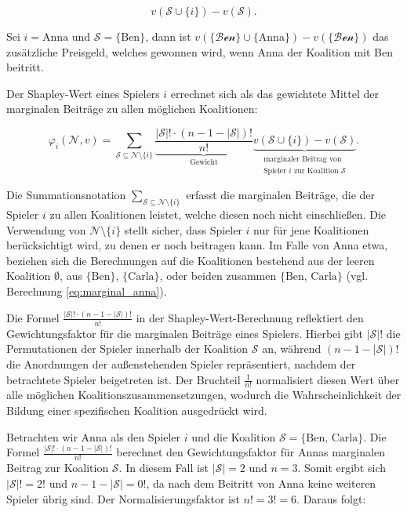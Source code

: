 \begin{equation}
v(\mathcal{S} \cup \{i\}) - v(\mathcal{S}).
\label{eq:marignal}
\end{equation}


Sei $i = \text{Anna}$ und $\mathcal{S} = \{\text{Ben}\}$, dann ist $v(\mathcal{\{\text{Ben}\}} \cup \{\text{Anna}\}) - v(\mathcal{\{\text{Ben}\}})$ das
zusätzliche Preisgeld, welches gewonnen wird, wenn Anna der Koalition mit Ben beitritt. 


Der Shapley-Wert eines Spielers $i$ errechnet sich als das gewichtete Mittel der marginalen Beiträge zu allen möglichen Koalitionen:

\begin{equation}
\varphi_i (\mathcal{N}, v) = \sum_{\mathcal{S} \subseteq \mathcal{N} \setminus \{i\}} \underbrace{\frac{|\mathcal{S}|! \cdot (n - 1 - |\mathcal{S}|)!}{n!}}_{\text{Gewicht}} \underbrace{v(\mathcal{S} \cup \{i\}) - v(\mathcal{S})}_{\substack{\text{marginaler Beitrag von} \\ \text{Spieler $i$ zur Koalition $\mathcal{S}$}}}.
\end{equation}

Die Summationsnotation \(\sum_{\mathcal{S} \subseteq \mathcal{N} \setminus \{i\}}\) erfasst die marginalen Beiträge, 
die der Spieler \( i \) zu allen Koalitionen leistet, welche diesen noch nicht einschließen. Die Verwendung von 
\(\mathcal{N} \setminus \{i\}\) stellt sicher, dass Spieler \( i \) nur für jene Koalitionen berücksichtigt wird, 
zu denen er noch beitragen kann. Im Falle von Anna etwa, beziehen sich die Berechnungen auf die Koalitionen bestehend 
aus der leeren Koalition \(\emptyset\), aus \(\{\text{Ben}\}\), \(\{\text{Carla}\}\), oder beiden 
zusammen \(\{\text{Ben, Carla}\}\) (vgl. Berechnung \ref{eq:marginal_anna}).

Die Formel \(\frac{|\mathcal{S}|! \cdot (n - 1 - |\mathcal{S}|)!}{n!}\) in der Shapley-Wert-Berechnung 
reflektiert den Gewichtungsfaktor für die marginalen Beiträge eines Spielers. Hierbei gibt \(|\mathcal{S}|!\) die Permutationen 
der Spieler innerhalb der Koalition \(\mathcal{S}\) an, während \((n - 1 - |\mathcal{S}|)!\) die Anordnungen der 
außenstehenden Spieler repräsentiert, nachdem der betrachtete Spieler beigetreten ist. 
Der Bruchteil \(\frac{1}{n!}\) normalisiert diesen Wert über alle möglichen Koalitionszusammensetzungen, 
wodurch die Wahrscheinlichkeit der Bildung einer spezifischen Koalition ausgedrückt wird.

Betrachten wir Anna als den Spieler $i$ und die Koalition \(\mathcal{S} = \{\text{Ben, Carla}\}\). 
Die Formel \(\frac{|\mathcal{S}|! \cdot (n - 1 - |\mathcal{S}|)!}{n!}\) berechnet den Gewichtungsfaktor 
für Annas marginalen Beitrag zur Koalition \(\mathcal{S}\). In diesem Fall ist \(|\mathcal{S}| = 2\) und \(n = 3\). 
Somit ergibt sich \(|\mathcal{S}|! = 2!\) und \(n - 1 - |\mathcal{S}| = 0!\), da nach dem Beitritt von 
Anna keine weiteren Spieler übrig sind. Der Normalisierungsfaktor ist \(n! = 3! = 6\). Daraus folgt:

